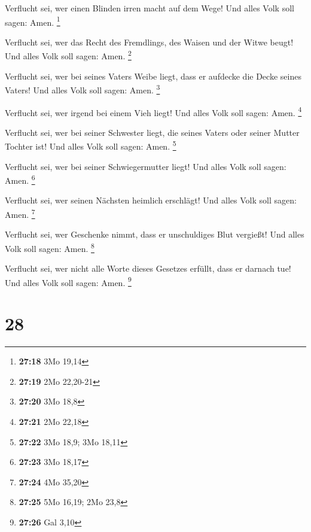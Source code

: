  Verflucht sei, wer einen Blinden irren macht auf dem Wege!
Und alles Volk soll sagen: Amen. \footnote{\textbf{27:18} 3Mo 19,14}

 Verflucht sei, wer das Recht des Fremdlings, des Waisen
und der Witwe beugt! Und alles Volk soll sagen: Amen. \footnote{\textbf{27:19}
  2Mo 22,20-21}

 Verflucht sei, wer bei seines Vaters Weibe liegt, dass er
aufdecke die Decke seines Vaters! Und alles Volk soll sagen: Amen.
\footnote{\textbf{27:20} 3Mo 18,8}

 Verflucht sei, wer irgend bei einem Vieh liegt! Und alles
Volk soll sagen: Amen. \footnote{\textbf{27:21} 2Mo 22,18}

 Verflucht sei, wer bei seiner Schwester liegt, die seines
Vaters oder seiner Mutter Tochter ist! Und alles Volk soll sagen: Amen.
\footnote{\textbf{27:22} 3Mo 18,9; 3Mo 18,11}

 Verflucht sei, wer bei seiner Schwiegermutter liegt! Und
alles Volk soll sagen: Amen. \footnote{\textbf{27:23} 3Mo 18,17}

 Verflucht sei, wer seinen Nächsten heimlich erschlägt! Und
alles Volk soll sagen: Amen. \footnote{\textbf{27:24} 4Mo 35,20}

 Verflucht sei, wer Geschenke nimmt, dass er unschuldiges
Blut vergießt! Und alles Volk soll sagen: Amen. \footnote{\textbf{27:25}
  5Mo 16,19; 2Mo 23,8}

 Verflucht sei, wer nicht alle Worte dieses Gesetzes
erfüllt, dass er darnach tue! Und alles Volk soll sagen: Amen.
\footnote{\textbf{27:26} Gal 3,10}

\hypertarget{section-7}{%
\section{28}\label{section-7}}


